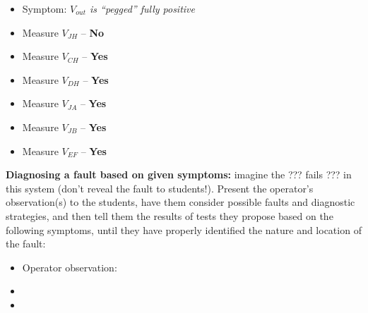 \begin{itemize}
\item{} Symptom: {\it $V_{out}$ is ``pegged'' fully positive}
\item{} Measure $V_{JH}$ -- {\bf No}
\item{} Measure $V_{CH}$ -- {\bf Yes}
\item{} Measure $V_{DH}$ -- {\bf Yes}
\item{} Measure $V_{JA}$ -- {\bf Yes}
\item{} Measure $V_{JB}$ -- {\bf Yes}
\item{} Measure $V_{EF}$ -- {\bf Yes}
\end{itemize}


\vskip 10pt


\noindent
{\bf Diagnosing a fault based on given symptoms:} imagine the ??? fails ??? in this system (don't reveal the fault to students!).  Present the operator's observation(s) to the students, have them consider possible faults and diagnostic strategies, and then tell them the results of tests they propose based on the following symptoms, until they have properly identified the nature and location of the fault:

\begin{itemize}
\item{} Operator observation: {\it }
\item{} 
\item{} 
\end{itemize}



